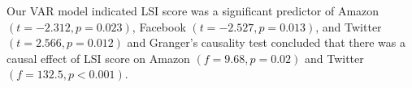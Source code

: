 \documentclass[17pt, a1paper, portrait, margin=0mm, innermargin=1mm,
     blockverticalspace=3mm, colspace=5mm, subcolspace=5mm]{tikzposter} %
\begin{document}
\begin{columns}
{   Our VAR model indicated LSI score was a significant predictor of Amazon
   $(t = -2.312, p = 0.023)$, Facebook $(t = -2.527, p = 0.013)$, and Twitter
   $(t = 2.566, p = 0.012)$ and Granger's causality test concluded that there
   was a causal effect of LSI score on Amazon $(f = 9.68, p = 0.02)$ and
   Twitter $(f = 132.5, p < 0.001)$.
   }


 \end{columns}
\end{document}
